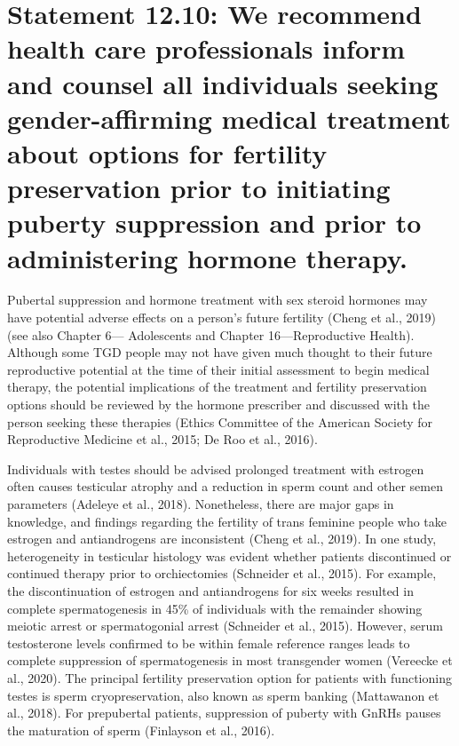 \documentclass[
]{book}
\begin{document}
\hypertarget{statement-12.10-we-recommend-health-care-professionals-inform-and-counsel-all-individuals-seeking-gender-affirming-medical-treatment-about-options-for-fertility-preservation-prior-to-initiating-puberty-suppression-and-prior-to-administering-hormone-therapy.}{%
\section*{Statement 12.10: We recommend health care professionals inform and counsel all individuals seeking gender-affirming medical treatment about options for fertility preservation prior to initiating puberty suppression and prior to administering hormone therapy.}\label{statement-12.10-we-recommend-health-care-professionals-inform-and-counsel-all-individuals-seeking-gender-affirming-medical-treatment-about-options-for-fertility-preservation-prior-to-initiating-puberty-suppression-and-prior-to-administering-hormone-therapy.}}

Pubertal suppression and hormone treatment
with sex steroid hormones may have potential
adverse effects on a person's future fertility
(Cheng et al., 2019) (see also Chapter 6---
Adolescents and Chapter 16---Reproductive
Health). Although some TGD people may not
have given much thought to their future reproductive potential at the time of their initial
assessment to begin medical therapy, the potential
implications of the treatment and fertility preservation options should be reviewed by the hormone prescriber and discussed with the person
seeking these therapies (Ethics Committee of the
American Society for Reproductive Medicine
et al., 2015; De Roo et al., 2016).

Individuals with testes should be advised prolonged treatment with estrogen often causes
testicular atrophy and a reduction in sperm count
and other semen parameters (Adeleye et al.,
2018). Nonetheless, there are major gaps in
knowledge, and findings regarding the fertility of
trans feminine people who take estrogen and
antiandrogens are inconsistent (Cheng et al.,
2019). In one study, heterogeneity in testicular
histology was evident whether patients discontinued or continued therapy prior to orchiectomies (Schneider et al., 2015). For example, the
discontinuation of estrogen and antiandrogens for
six weeks resulted in complete spermatogenesis
in 45\% of individuals with the remainder showing
meiotic arrest or spermatogonial arrest (Schneider
et al., 2015). However, serum testosterone levels
confirmed to be within female reference ranges
leads to complete suppression of spermatogenesis
in most transgender women (Vereecke et al.,
2020). The principal fertility preservation option
for patients with functioning testes is sperm cryopreservation, also known as sperm banking
(Mattawanon et al., 2018). For prepubertal
patients, suppression of puberty with GnRHs
pauses the maturation of sperm (Finlayson
et al., 2016).
\end{document}
